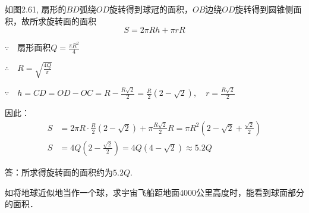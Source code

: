 \begin{solution}
    如图2.61, 扇形的$BD$弧绕$OD$旋转得到球冠的面积，$OB$边绕$OD$旋转得到圆锥侧面积，故所求旋转面的面积
\[S=2\pi Rh+\pi rR\]

$\because\quad \text{扇形面积}Q=\frac{\pi R^2}{4}$

$\therefore\quad R=\sqrt{\frac{4Q}{\pi}}$

$\because\quad h=CD=OD-OC=R-\frac{R\sqrt{2}}{2}=\frac{R}{2}(2-\sqrt{2}),\quad r=\frac{R\sqrt{2}}{2}$

因此：
\[\begin{split}
    S&=2\pi R\cdot \frac{R}{2}\left(2-\sqrt{2}\right)+\pi\frac{R\sqrt{2}}{2}R=\pi R^2\left(2-\sqrt{2}+\frac{\sqrt{2}}{2}\right)\\
    S&=4Q\left(2-\frac{\sqrt{2}}{2}\right)=4Q\left(4-\sqrt{2}\right)\approx 5.2Q
\end{split}\]

答：所求得旋转面的面积约为$5.2Q$.
\end{solution}


  \begin{example}
    如将地球近似地当作一个球，求宇宙飞船距地面4000公里高度时，能看到球面部分的面积．
  \end{example}

\begin{figure}[htp]
    \centering
{}
    \caption{}
\end{figure}

